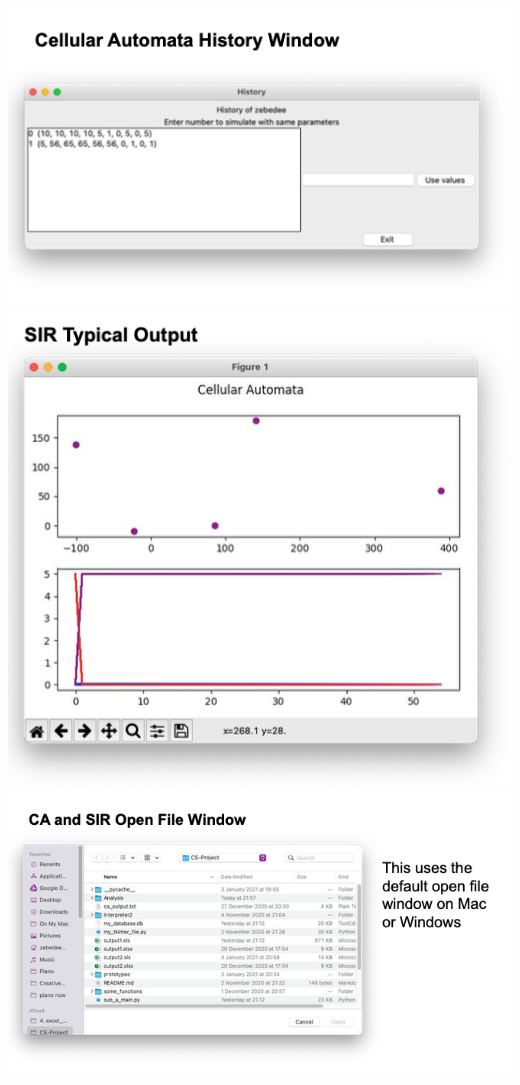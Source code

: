 \documentclass[11pt, a4paper]{article}
\begin{document}
\includegraphics[width=\textwidth]{a_ca_history.png}
\includegraphics[width=\textwidth]{a_ca_output.png}
\includegraphics[width=\textwidth]{a_open_file.png}
\end{document}
